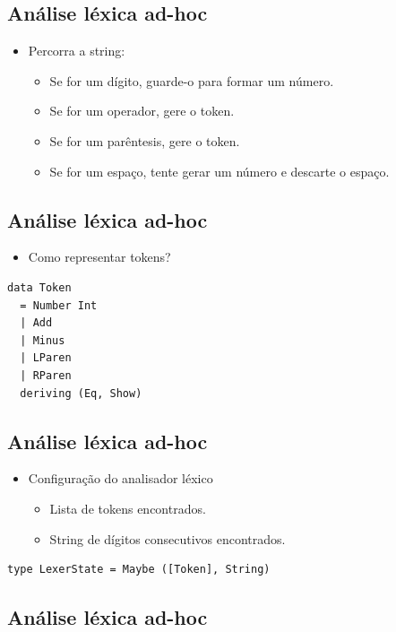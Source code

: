 \documentclass[11pt]{article}
\begin{document}
\subsection*{Análise léxica ad-hoc}
\label{sec:org9cd9b28}

\begin{itemize}
\item Percorra a string:
\begin{itemize}
\item Se for um dígito, guarde-o para formar um número.
\item Se for um operador, gere o token.
\item Se for um parêntesis, gere o token.
\item Se for um espaço, tente gerar um número e descarte o espaço.
\end{itemize}
\end{itemize}
\subsection*{Análise léxica ad-hoc}
\label{sec:org65d199b}

\begin{itemize}
\item Como representar tokens?
\end{itemize}

\begin{verbatim}
data Token
  = Number Int
  | Add
  | Minus
  | LParen
  | RParen
  deriving (Eq, Show)
\end{verbatim}
\subsection*{Análise léxica ad-hoc}
\label{sec:org291d2b6}

\begin{itemize}
\item Configuração do analisador léxico
\begin{itemize}
\item Lista de tokens encontrados.
\item String de dígitos consecutivos encontrados.
\end{itemize}
\end{itemize}

\begin{verbatim}
type LexerState = Maybe ([Token], String)
\end{verbatim}
\subsection*{Análise léxica ad-hoc}
\label{sec:org708e85f}
\end{document}
